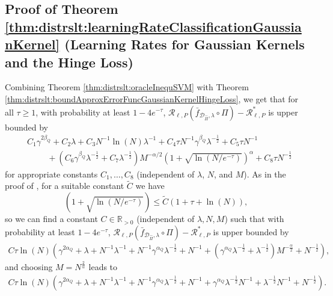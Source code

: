 \documentclass[letterpaper]{article} %
\newcommand{\R}{\mathbb{R}}
\newcommand{\Rp}{\R_{> 0}}
\newcommand{\dataSet}{\mathcal{D}}
\newcommand{\risk}{\mathcal{R}} %
\newcommand{\Risk}[2]{\risk_{{#1},{#2}}} %
\newcommand{\RiskBayes}[2]{\risk_{{#1},{#2}}^\ast} %
\newcommand{\hilbertianEmbed}{\Pi} %
\newcommand{\clipped}[1]{\bar{#1}}
\begin{document}
\subsection{Proof of Theorem \ref{thm:distrslt:learningRateClassificationGaussianKernel} (Learning Rates for Gaussian Kernels and the Hinge Loss)} \label{sec:distrslt:proofOflearningRateClassificationGaussianKernel}
Combining Theorem \ref{thm:distrslt:oracleInequSVM} with Theorem \ref{thm:distrslt:boundApproxErrorFuncGaussianKernelHingeLoss}, we get that for all $\tau\geq 1$, with probability at least $1-4e^{-\tau}$, $ \Risk{\ell}{P}(\clipped{f}_{\dataSet_{\hat\hilbertianEmbed},\lambda} \circ \hilbertianEmbed) - \RiskBayes{\ell}{P}$
is upper bounded by 
\begin{align*}
    & C_1 \gamma^{2\beta_Q} + C_2\lambda + C_3N^{-1}\ln(N)\lambda^{-1} 
        + C_4\tau N^{-1}\gamma^{\beta_Q}\lambda^{-\frac12} + C_5\tau N^{-1} \\
    & \hspace{1cm} + \left( C_6 \gamma^{\beta_Q} \lambda^{-\frac12} + C_7 \lambda^{-\frac12} \right)
        M^{-\alpha/2}(1+\sqrt{\ln(N/e^{-\tau})})^\alpha
        + C_8 \tau N^{-\frac12}
\end{align*} 
for appropriate constants $C_1,\ldots,C_8$ (independent of $\lambda$, $N$, and $M$).
As in the proof of , for a suitable constant $\tilde C$ we have
\begin{equation*}
    (1+\sqrt{\ln(N/e^{-\tau})}) \leq \tilde C(1+\tau+\ln(N)),
\end{equation*}
so we can find a constant $C\in\Rp$ (independent of $\lambda,N,M$) such that with probability at least $1-4e^{-\tau}$, $\Risk{\ell}{P}(\clipped{f}_{\dataSet_{\hat\hilbertianEmbed},\lambda} \circ \hilbertianEmbed) - \RiskBayes{\ell}{P}$ is upper bounded by
\begin{align*}
    C \tau \ln(N)\left(
       \gamma^{2\alpha_Q} + \lambda + N^{-1}\lambda^{-1} + N^{-1}\gamma^{\alpha_Q}\lambda^{-\frac12} + N^{-1}  
       + \left( \gamma^{\alpha_Q} \lambda^{-\frac12} + \lambda^{-\frac12} \right)M^{-\frac{\alpha}{2}} +  N^{-\frac12}
    \right),
\end{align*}
and choosing $M=N^{\frac{2}{\alpha}}$ leads to
\begin{align*}
    C \tau \ln(N)\left(
       \gamma^{2\alpha_Q} + \lambda + N^{-1}\lambda^{-1} + N^{-1}\gamma^{\alpha_Q}\lambda^{-\frac12} + N^{-1}  
       + \gamma^{\alpha_Q} \lambda^{-\frac12}N^{-1} + \lambda^{-\frac12} N^{-1} +  N^{-\frac12}
    \right).
\end{align*}
\end{document}

